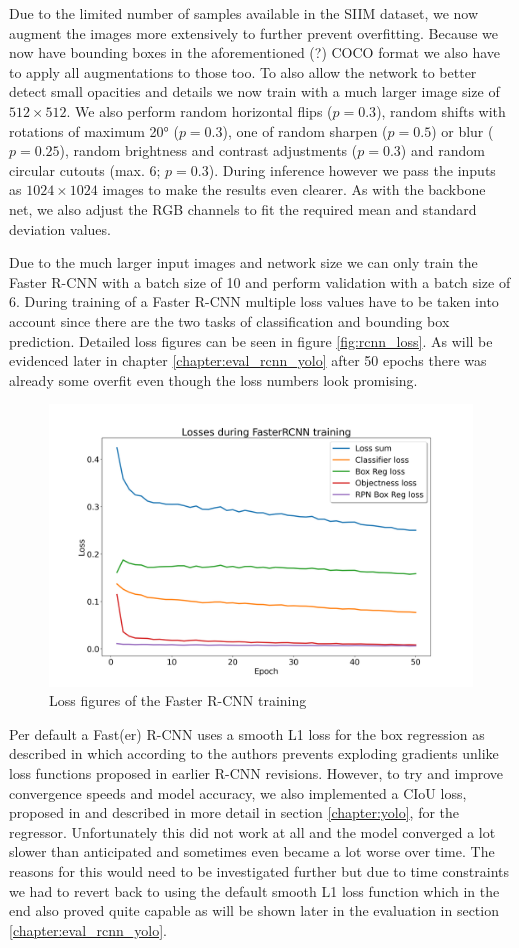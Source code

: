 Due to the limited number of samples available in the SIIM dataset, we now augment the images more extensively to further prevent overfitting. Because we now have bounding boxes in the aforementioned (?) COCO format we also have to apply all augmentations to those too. To also allow the network to better detect small opacities and details we now train with a much larger image size of $512 \times 512$. We also perform random horizontal flips ($p=0.3$), random shifts with rotations of maximum 20° ($p=0.3$), one of random sharpen ($p=0.5$) or blur ($p=0.25$), random brightness and contrast adjustments ($p=0.3$) and random circular cutouts (max. 6; $p=0.3$). During inference however we pass the inputs as $1024 \times 1024$ images to make the results even clearer. As with the backbone net, we also adjust the RGB channels to fit the required mean and standard deviation values.

Due to the much larger input images and network size we can only train the Faster R-CNN with a batch size of 10 and perform validation with a batch size of 6. During training of a Faster R-CNN multiple loss values have to be taken into account since there are the two tasks of classification and bounding box prediction. Detailed loss figures can be seen in figure \vref{fig:rcnn_loss}. As will be evidenced later in chapter \vref{chapter:eval_rcnn_yolo} after 50 epochs there was already some overfit even though the loss numbers look promising.

\begin{figure}
	\centering
	\includegraphics[width=.7\linewidth]{img/loss_fasterrcnn_50.png}
	\caption{Loss figures of the Faster R-CNN training}
	\label{fig:rcnn_loss}
\end{figure}

Per default a Fast(er) R-CNN uses a smooth L1 loss for the box regression as described in \autocite{girshick_fast_2015} which according to the authors prevents exploding gradients unlike loss functions proposed in earlier R-CNN revisions. However, to try and improve convergence speeds and model accuracy, we also implemented a \ac{CIoU} loss, proposed in \autocite{zheng_enhancing_2021} and described in more detail in section \vref{chapter:yolo}, for the regressor. Unfortunately this did not work at all and the model converged a lot slower than anticipated and sometimes even became a lot worse over time. The reasons for this would need to be investigated further but due to time constraints we had to revert back to using the default smooth L1 loss function which in the end also proved quite capable as will be shown later in the evaluation in section \vref{chapter:eval_rcnn_yolo}.

